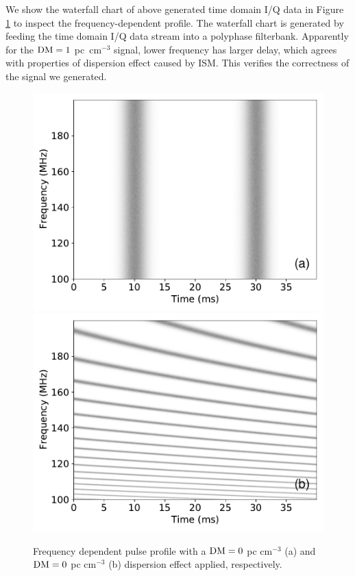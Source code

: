 \documentclass[fleqn,usenatbib]{mnras}
\begin{document}
We show the waterfall chart of above generated time domain I/Q data in Figure \ref{fig:fb} to inspect the frequency-dependent profile.
The waterfall chart is generated by feeding the time domain I/Q data stream into a polyphase filterbank.
Apparently for the ${\rm DM}=1$ pc~cm$^{-3}$ signal, lower frequency has larger delay, which agrees with properties of dispersion effect caused by ISM. 
This verifies the correctness of the signal we generated.

\begin{figure}
    \centering
    \includegraphics[width=0.9\columnwidth]{dm0_fb.pdf}
    \includegraphics[width=0.9\columnwidth]{dm1_fb.pdf}
    \caption{Frequency dependent pulse profile with a $\rm DM=0$ pc cm$^{-3}$ (a) and $\rm DM=0$ pc cm$^{-3}$ (b) dispersion effect applied, respectively.}
    \label{fig:fb}
\end{figure}
\end{document}
